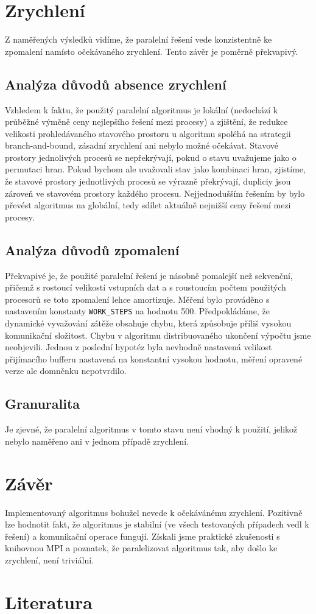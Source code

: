 \documentclass[12pt]{article}
\begin{document}
\section{Zrychlení}
Z naměřených výsledků vidíme, že paralelní řešení vede konzistentně ke zpomalení namísto očekávaného zrychlení. Tento závěr je poměrně překvapivý. 
\subsection{Analýza důvodů absence zrychlení}
Vzhledem k faktu, že použitý paralelní algoritmus je lokální (nedochází k průběžné výměně ceny nejlepšího řešení mezi procesy) a zjištění, že redukce velikosti prohledávaného stavového prostoru u algoritmu spoléhá na strategii branch-and-bound, zásadní zrychlení ani nebylo možné očekávat. Stavové prostory jednolivých procesů se nepřekrývají, pokud o stavu uvažujeme jako o permutaci hran. Pokud bychom ale uvažovali stav jako kombinaci hran, zjistíme, že stavové prostory jednotlivých procesů se výrazně překrývají, dupliciy jsou zároveň ve stavovém prostory každého procesu. Nejjednodušším řešením by bylo převést algoritmus na globální, tedy sdílet aktuálně nejnižší ceny řešení mezi procesy.

\subsection{Analýza důvodů zpomalení}
Překvapivé je, že použité paralelní řešení je násobně pomalejší než sekvenční, přičemž s rostoucí velikostí vstupních dat a s roustoucím počtem použitých procesorů se toto zpomalení lehce amortizuje. Měření bylo prováděno s nastavením konstanty \texttt{WORK\_STEPS} na hodnotu 500. Předpokládáme, že dynamické vyvažování zátěže obsahuje chybu, která způsobuje příliš vysokou komunikační složitost. Chybu v algoritmu distribuovaného ukončení výpočtu jsme neobjevili. Jednou z poslední hypotéz byla nevhodně nastavená velikost přijímacího bufferu nastavená na konstantní vysokou hodnotu, měření opravené verze ale domněnku nepotvrdilo.

\subsection{Granuralita}
Je zjevné, že paralelní algoritmus v tomto stavu není vhodný k použití, jelikož nebylo naměřeno ani v jednom případě zrychlení.

\section{Závěr}

Implementovaný algoritmus bohužel nevede k očekávánému zrychlení. Pozitivně lze hodnotit fakt, že algoritmus je stabilní (ve všech testovaných případech vedl k řešení) a komunikační operace fungují. Získali jsme praktické zkušenosti s knihovnou MPI a poznatek, že paralelizovat algoritmus tak, aby došlo ke zrychlení, není triviální.

\section{Literatura}

\appendix
\end{document}
